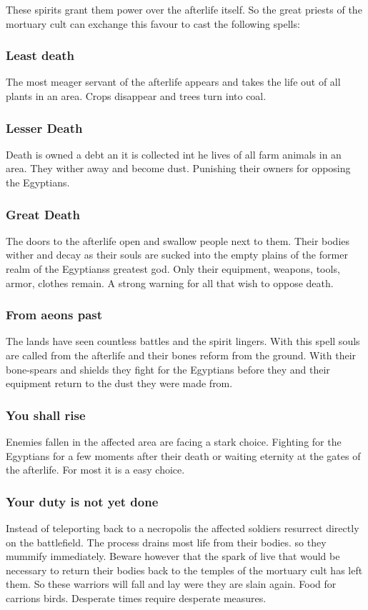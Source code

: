 These spirits grant them power over the afterlife itself. So the great priests
of the mortuary cult can exchange this favour to cast the following spells:

\subsubsection{Least death}
The most meager servant of the afterlife appears and takes the life out of all
plants in an area. Crops disappear and trees turn into coal.

\subsubsection{Lesser Death}
Death is owned a debt an it is collected int he lives of all farm animals in an
area. They wither away and become dust. Punishing their owners for opposing the
\gls{Egyptians}.

\subsubsection{Great Death}
The doors to the afterlife open and swallow people next to them. Their bodies
wither and decay as their souls are sucked into the empty plains of the former
realm of the \gls{Egyptians}s greatest god. Only their equipment, weapons,
tools, armor, clothes remain. A strong warning for all that wish to oppose
death.

\subsubsection{From aeons past}
The lands have seen countless battles and the spirit lingers. With this spell
souls are called from the afterlife and their bones reform from the ground.
With their bone-spears and shields they fight for the \gls{Egyptians} before
they and their equipment return to the dust they were made from.

\subsubsection{You shall rise}
Enemies fallen in the affected area are facing a stark choice. Fighting for the
\gls{Egyptians} for a few moments after their death or waiting eternity at the
gates of the afterlife. For most it is a easy choice.

\subsubsection{Your duty is not yet done}
Instead of teleporting back to a necropolis the affected soldiers resurrect
directly on the battlefield. The process drains most life from their bodies. so
they mummify immediately. Beware however that the spark of live that would be
necessary to return their bodies back to the temples of the mortuary cult has
left them. So these warriors will fall and lay were they are slain again. Food
for carrions birds. Desperate times require desperate measures.

